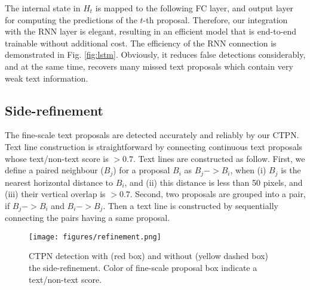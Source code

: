 \documentclass[runningheads]{llncs}
\begin{document}

The internal state in $H_t$ is mapped to the following FC layer, and output layer for computing the predictions of the $t$-th proposal. Therefore, our integration with the RNN layer is elegant, resulting in an efficient model that is end-to-end trainable without additional cost. The efficiency of the RNN connection is demonstrated in Fig. \ref{fig:lstm}. Obviously, it reduces false detections considerably, and at the same time,  recovers many missed text proposals which contain very weak text information.

\subsection{Side-refinement}
The fine-scale text proposals are detected accurately and reliably by our CTPN. Text line construction is straightforward by connecting continuous text proposals whose text/non-text score is $>0.7$. Text lines are constructed as follow. First, we define a paired neighbour ($B_j$) for a proposal $B_i$ as $B_j->B_i$, when  (i) $B_j$ is the nearest horizontal distance to $B_i$, and (ii) this distance is less than 50 pixels, and (iii) their vertical overlap is $>0.7$. Second, two proposals are grouped into a pair, if $B_j->B_i$ and $B_i->B_j$. Then a text line is constructed by sequentially connecting  the pairs  having a same proposal.


 \begin{figure}[tb]
\centering
\texttt{[image: figures/refinement.png]}
\caption{CTPN detection with (red box) and without (yellow dashed box) the side-refinement. Color of fine-scale proposal box indicate a text/non-text score.}
\label{fig:refinement}
\end{figure}
\end{document}
